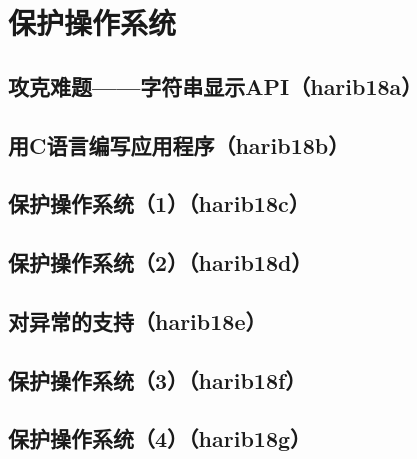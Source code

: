 ﻿\chapter{	保护操作系统	}
\section{	攻克难题——字符串显示API（harib18a）	}
\section{	用C语言编写应用程序（harib18b）	}
\section{	保护操作系统（1）（harib18c）	}
\section{	保护操作系统（2）（harib18d）	}
\section{	对异常的支持（harib18e）	}
\section{	保护操作系统（3）（harib18f）	}
\section{	保护操作系统（4）（harib18g）	}

